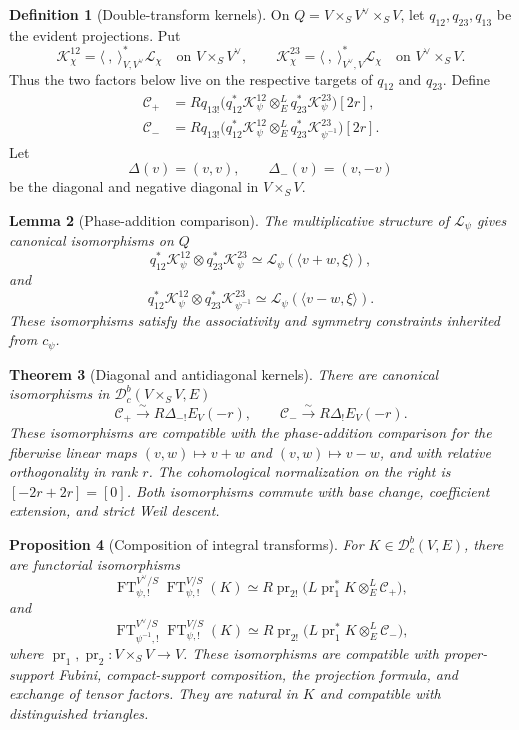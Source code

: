 \documentclass[10pt]{article}
\newtheorem{theorem}{Theorem}[section]
\newtheorem{lemma}[theorem]{Lemma}
\newtheorem{proposition}[theorem]{Proposition}
\theoremstyle{definition}
\newtheorem{definition}[theorem]{Definition}
\newcommand{\Dbc}{\mathcal D^b_c}
\newcommand{\FT}{\operatorname{FT}}
\begin{document}
\begin{definition}[Double-transform kernels]
On
\(Q=V\times_SV^\vee\times_SV\), let
\(q_{12},q_{23},q_{13}\) be the evident projections.  Put
\[
 \mathcal K_\chi^{12}
 =\langle\ ,\ \rangle_{V,V^\vee}^*\mathcal L_\chi
 \quad\text{on }V\times_SV^\vee,
 \qquad
 \mathcal K_\chi^{23}
 =\langle\ ,\ \rangle_{V^\vee,V}^*\mathcal L_\chi
 \quad\text{on }V^\vee\times_SV.
\]
Thus the two factors below live on the respective targets of \(q_{12}\)
and \(q_{23}\).  Define
\[
 \begin{aligned}
 \mathcal C_+&=Rq_{13!}\bigl(
 q_{12}^*\mathcal K_\psi^{12}\otimes_E^L
 q_{23}^*\mathcal K_\psi^{23}\bigr)[2r],\\
 \mathcal C_-&=Rq_{13!}\bigl(
 q_{12}^*\mathcal K_\psi^{12}\otimes_E^L
 q_{23}^*\mathcal K_{\psi^{-1}}^{23}\bigr)[2r].
 \end{aligned}
\]
Let
\[
 \Delta(v)=(v,v),\qquad \Delta_-(v)=(v,-v)
\]
be the diagonal and negative diagonal in \(V\times_SV\).
\end{definition}

\begin{lemma}[Phase-addition comparison]
The multiplicative structure of \(\mathcal L_\psi\) gives canonical
isomorphisms on \(Q\)
\[
 q_{12}^*\mathcal K_\psi^{12}\otimes q_{23}^*\mathcal K_\psi^{23}
 \simeq
 \mathcal L_\psi(\langle v+w,\xi\rangle),
\]
and
\[
 q_{12}^*\mathcal K_\psi^{12}\otimes
 q_{23}^*\mathcal K_{\psi^{-1}}^{23}
 \simeq
 \mathcal L_\psi(\langle v-w,\xi\rangle).
\]
These isomorphisms satisfy the associativity and symmetry constraints
inherited from \(c_\psi\).
\end{lemma}

\begin{theorem}[Diagonal and antidiagonal kernels]
There are canonical isomorphisms in \(\Dbc(V\times_SV,E)\)
\[
 \mathcal C_+\xrightarrow{\sim}R\Delta_{-!}E_V(-r),
 \qquad
 \mathcal C_-\xrightarrow{\sim}R\Delta_!E_V(-r).
\]
These isomorphisms are compatible with the phase-addition comparison for
the fiberwise linear maps \((v,w)\mapsto v+w\) and \((v,w)\mapsto v-w\),
and with relative orthogonality in rank \(r\).  The cohomological normalization on
the right is \([-2r+2r]=[0]\).
Both isomorphisms commute with base change, coefficient extension, and
strict Weil descent.
\end{theorem}

\begin{proposition}[Composition of integral transforms]
For \(K\in\Dbc(V,E)\), there are functorial isomorphisms
\[
 \FT^{V^\vee/S}_{\psi,!}\FT^{V/S}_{\psi,!}(K)
 \simeq
 R\operatorname{pr}_{2!}
 \bigl(L\operatorname{pr}_1^*K\otimes_E^L\mathcal C_+\bigr),
\]
and
\[
 \FT^{V^\vee/S}_{\psi^{-1},!}\FT^{V/S}_{\psi,!}(K)
 \simeq
 R\operatorname{pr}_{2!}
 \bigl(L\operatorname{pr}_1^*K\otimes_E^L\mathcal C_-\bigr),
\]
where \(\operatorname{pr}_1,\operatorname{pr}_2:V\times_SV\to V\).
These isomorphisms are compatible with proper-support Fubini,
compact-support composition, the projection formula, and exchange of
tensor factors.  They are natural in \(K\) and compatible with distinguished
triangles.
\end{proposition}
\end{document}
